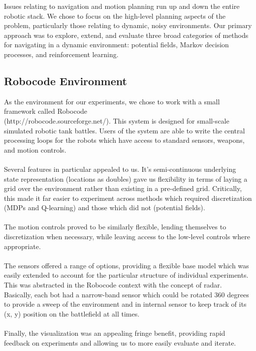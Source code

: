 \documentclass{aiaa-tc}%
\begin{document}
Issues relating to navigation and motion planning run up and down the entire
robotic stack. We chose to focus on the high-level planning aspects of the problem, particularly those relating to dynamic, noisy environments. Our primary approach was to explore, extend, and
evaluate three broad categories of methods for navigating in a dynamic
environment: potential fields, Markov decision processes, and
reinforcement learning.

\subsection{Robocode Environment}

As the environment for our experiments, we chose to work with a small
framework called Robocode \\(http://robocode.sourceforge.net/). This system is designed for small-scale
simulated robotic tank battles. Users of the system are able to write
the central processing loops for the robots which have access to
standard sensors, weapons, and motion controls. \\ \\
Several features in particular appealed to us. It's semi-continuous underlying state
representation (locations as doubles) gave us flexibility in
terms of laying a grid over the environment rather than existing in a
pre-defined grid. Critically, this made it far easier to experiment
across methods which required discretization (MDPs and Q-learning) and
those which did not (potential fields). \\ \\
The motion controls proved to be similarly flexible, lending
themselves to discretization when necessary, while leaving access to
the low-level controls where appropriate. \\ \\
The sensors offered a range of options, providing a flexible base
model which was easily extended to account for the particular
structure of individual
experiments. This was abstracted in the Robocode context with the
concept of radar. Basically, each bot had a narrow-band sensor which could be rotated 360 degrees to provide a sweep of the environment and in internal sensor to keep track of its (x, y) position on the battlefield at all times. \\ \\
Finally, the visualization was an appealing fringe benefit, providing
rapid feedback on experiments and allowing us to more easily evaluate
and iterate. \\ \\
\end{document}
